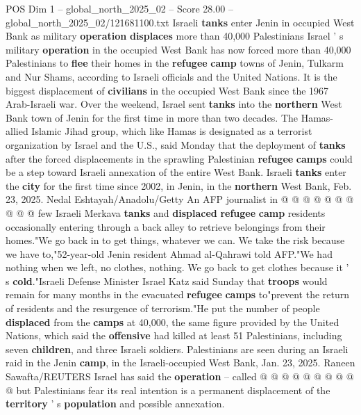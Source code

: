\begin{textsample}{POS Dim 1 – global\_north\_2025\_02 – Score 28.00 – global\_north\_2025\_02/121681100.txt}  \label{ex:f1_pos_435}
Israeli \textbf{tanks} enter Jenin in occupied West Bank as military \textbf{operation} \textbf{displaces} more than 40,000 Palestinians Israel ' s military \textbf{operation} in the occupied West Bank has now forced more than 40,000 Palestinians to \textbf{flee} their homes in the \textbf{refugee} \textbf{camp} towns of Jenin, Tulkarm and Nur Shams, according to Israeli officials and the United Nations.
It is the biggest displacement of \textbf{civilians} in the occupied West Bank since the 1967 Arab-Israeli war.
Over the weekend, Israel sent \textbf{tanks} into the \textbf{northern} West Bank town of Jenin for the first time in more than two decades.
The Hamas-allied Islamic Jihad group, which like Hamas is designated as a terrorist organization by Israel and the U.S., said Monday that the deployment of \textbf{tanks} after the forced displacements in the sprawling Palestinian \textbf{refugee} \textbf{camps} could be a step toward Israeli annexation of the entire West Bank.
Israeli \textbf{tanks} enter the \textbf{city} for the first time since 2002, in Jenin, in the \textbf{northern} West Bank, Feb. 23, 2025.
Nedal Eshtayah/Anadolu/Getty An AFP journalist in @ @ @ @ @ @ @ @ @ @ few Israeli Merkava \textbf{tanks} and \textbf{displaced} \textbf{refugee} \textbf{camp} residents occasionally entering through a back alley to retrieve belongings from their homes."We go back in to get things, whatever we can.
We take the risk because we have to,"52-year-old Jenin resident Ahmad al-Qahrawi told AFP."We had nothing when we left, no clothes, nothing.
We go back to get clothes because it ' s \textbf{cold}."Israeli Defense Minister Israel Katz said Sunday that \textbf{troops} would remain for many months in the evacuated \textbf{refugee} \textbf{camps} to"prevent the return of residents and the resurgence of terrorism."He put the number of people \textbf{displaced} from the \textbf{camps} at 40,000, the same figure provided by the United Nations, which said the \textbf{offensive} had killed at least 51 Palestinians, including seven \textbf{children}, and three Israeli soldiers.
Palestinians are seen during an Israeli raid in the Jenin \textbf{camp}, in the Israeli-occupied West Bank, Jan. 23, 2025.
Raneen Sawafta/REUTERS Israel has said the \textbf{operation} -- called @ @ @ @ @ @ @ @ @ @ but Palestinians fear its real intention is a permanent displacement of the \textbf{territory} ' s \textbf{population} and possible annexation.

\end{textsample}
